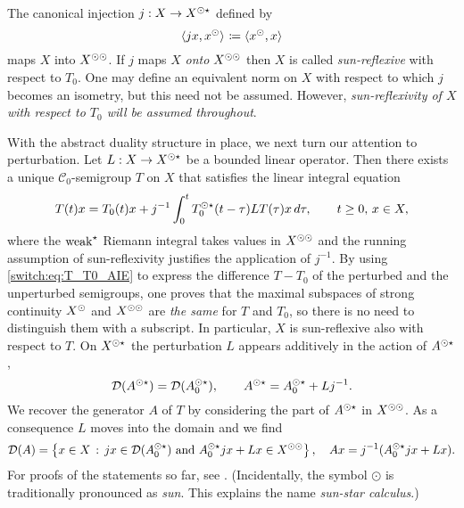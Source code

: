 The canonical injection $j : X \to X^{\odot\star}$ defined by
%
\begin{equation}
  \label{switch:eq:j}
  \langle jx,x^{\odot} \rangle_{} \coloneqq \langle x^{\odot},x \rangle_{}
\end{equation}
%
maps $X$ into $X^{\odot\odot}$. If $j$ maps $X$ \emph{onto} $X^{\odot\odot}$ then $X$ is called \emph{sun-reflexive} with respect to $T_0$. One may define an equivalent norm on $X$ with respect to which $j$ becomes an isometry, but this need not be assumed. However, \emph{sun-reflexivity of $X$ with respect to $T_0$ will be assumed throughout}.

With the abstract duality structure in place, we next turn our attention to perturbation. Let $L : X \to X^{\odot\star}$ be a bounded linear operator. Then there exists a unique $\mathcal{C}_0$-semigroup $T$ on $X$ that satisfies the linear integral equation
%
\begin{equation}
  \label{switch:eq:T_T0_AIE}
  T(t)x = T_0(t)x + j^{-1} \int_0^t T_0^{\odot\star}(t-\tau) L T(\tau)x \, d\tau, \qquad t \ge 0,\,x \in X,
\end{equation}
%
where the $\text{weak}^{\star}$ Riemann integral takes values in $X^{\odot\odot}$ and the running assumption of sun-reflexivity justifies the application of $j^{-1}$. By using \cref{switch:eq:T_T0_AIE} to express the difference $T - T_0$ of the perturbed and the unperturbed semigroups, one proves that the maximal subspaces of strong continuity $X^{\odot}$ and $X^{\odot\odot}$ are \emph{the same} for $T$ and $T_0$, so there is no need to distinguish them with a subscript. In particular, $X$ is sun-reflexive also with respect to $T$. On $X^{\odot\star}$ the perturbation $L$ appears additively in the action of $A^{\odot\star}$,
%
\begin{equation}
  \label{switch:eq:A_sunstar}
  \mathcal{D}(A^{\odot\star}) = \mathcal{D}(A_0^{\odot\star}), \qquad A^{\odot\star} = A_0^{\odot\star} + Lj^{-1}.
\end{equation}
%
We recover the generator $A$ of $T$ by considering the part of $A^{\odot\star}$ in $X^{\odot\odot}$. As a consequence $L$ moves into the domain and we find
\[
  \mathcal{D}(A) = \left\{x \in X\,:\, jx \in \mathcal{D}(A_0^{\odot\star}) \text{ and } A_0^{\odot\star}jx + Lx \in X^{\odot\odot}\right\}, \quad Ax = j^{-1}(A_0^{\odot\star}jx + Lx).
\]
For proofs of the statements so far, see \cite[Appendix II.3 and Chapter III]{diekmann1995delay}. (Incidentally, the symbol $\odot$ is traditionally pronounced as \emph{sun}. This explains the name \emph{sun-star calculus}.)

